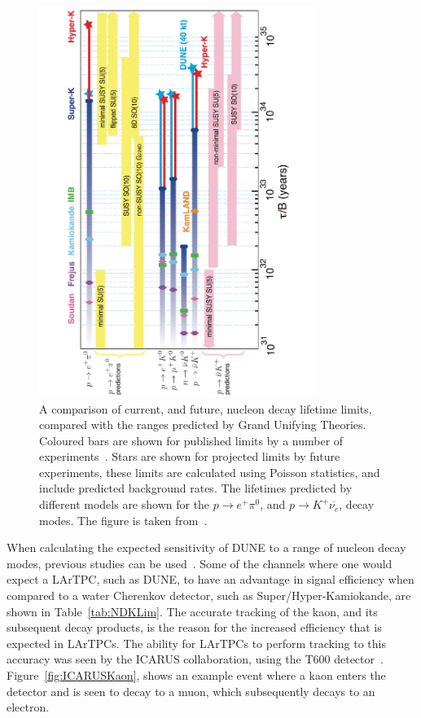 \begin{figure}
  \centering
  \includegraphics[width=0.8\textwidth]{NucleonDecayLimits}
  \caption[A comparison of current, and future, nucleon decay lifetime limits, compared with the ranges predicted by Grand Unifying Theories.]
          {A comparison of current, and future, nucleon decay lifetime limits, compared with the ranges predicted by Grand Unifying Theories. Coloured bars are shown for published limits by a number of experiments~\citep{PDG2012, Nishino:2012bnw}. Stars are shown for projected limits by future experiments, these limits are calculated using Poisson statistics, and include predicted background rates. The lifetimes predicted by different models are shown for the $p \rightarrow e^{+} \pi^{0}$, and $p \rightarrow K^{+} \overline{\nu_{e}}$, decay modes. The figure is taken from~\citep{DUNECDR_V2}.}
  \label{fig:DUNE_NDK_Lifetime}
\end{figure}

When calculating the expected sensitivity of DUNE to a range of nucleon decay modes, previous studies can be used~\citep{Bueno,Klinger:2015kva}. Some of the channels where one would expect a LArTPC, such as DUNE, to have an advantage in signal efficiency when compared to a water Cherenkov detector, such as Super/Hyper-Kamiokande, are shown in Table~\ref{tab:NDKLim}. The accurate tracking of the kaon, and its subsequent decay products, is the reason for the increased efficiency that is expected in LArTPCs. The ability for LArTPCs to perform tracking to this accuracy was seen by the ICARUS collaboration, using the T600 detector~\citep{PMTrack}. Figure~\ref{fig:ICARUSKaon}, shows an example event where a kaon enters the detector and is seen to decay to a muon, which subsequently decays to an electron. \\


